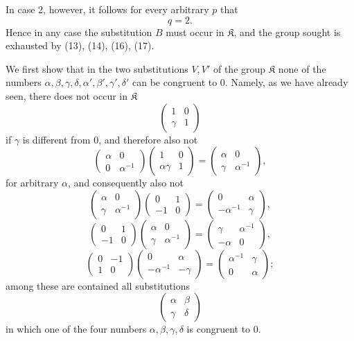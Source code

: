\documentclass[11pt]{article}
\providecommand{\Kgrp}{\mathfrak K}
\begin{document}
In case 2, however, it follows for every arbitrary $p$ that
\[
 q=2.
\]
Hence in any case the substitution $B$ must occur in $\Kgrp$, and the group sought is exhausted by (13), (14), (16), (17).

We first show that in the two substitutions $V,V'$ of the group $\Kgrp$ none of the numbers $\alpha,\beta,\gamma,\delta,\alpha',\beta',\gamma',\delta'$ can be congruent to $0$. Namely, as we have already seen, there does not occur in $\Kgrp$
\[
 \begin{pmatrix}1&0\\ \gamma&1\end{pmatrix}
\]
if $\gamma$ is different from $0$, and therefore also not
\[
 \begin{pmatrix}\alpha&0\\0&\alpha^{-1}\end{pmatrix}
 \begin{pmatrix}1&0\\ \alpha\gamma&1\end{pmatrix}
 =
 \begin{pmatrix}\alpha&0\\ \gamma&\alpha^{-1}\end{pmatrix},
\]
for arbitrary $\alpha$, and consequently also not
\[
 \begin{pmatrix}\alpha&0\\ \gamma&\alpha^{-1}\end{pmatrix}
 \begin{pmatrix}0&1\\-1&0\end{pmatrix}
 =
 \begin{pmatrix}0&\alpha\\-\alpha^{-1}&\gamma\end{pmatrix},
\]
\[
 \begin{pmatrix}0&1\\-1&0\end{pmatrix}
 \begin{pmatrix}\alpha&0\\ \gamma&\alpha^{-1}\end{pmatrix}
 =
 \begin{pmatrix}\gamma&\alpha^{-1}\\-\alpha&0\end{pmatrix},
\]
\[
 \begin{pmatrix}0&-1\\1&0\end{pmatrix}
 \begin{pmatrix}0&\alpha\\-\alpha^{-1}&-\gamma\end{pmatrix}
 =
 \begin{pmatrix}\alpha^{-1}&\gamma\\0&\alpha\end{pmatrix};
\]
among these are contained all substitutions
\[
 \begin{pmatrix}\alpha&\beta\\ \gamma&\delta\end{pmatrix}
\]
in which one of the four numbers $\alpha,\beta,\gamma,\delta$ is congruent to $0$.
\end{document}
